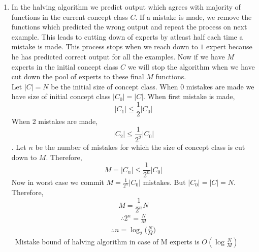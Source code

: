 \begin{enumerate}
    \item
		In the halving algorithm we predict output which agrees with majority of functions in the current concept class $C$. If a mistake is made, we remove the functions which predicted the wrong output and repeat the process on next example. This leads to cutting down of experts by atleast half      each time a mistake is made. This process stops when we reach down to $1$ expert because he has predicted correct output for all the examples. Now if we have $M$ experts in the initial concept class $C$ we will stop the algorithm when we have cut down the pool of experts  to these final $M$ functions.\\
		Let $|C| = N$ be the initial size of concept class. When $0$ mistakes are made we have size of initial concept class $|C_0| = |C|$. When first mistake is made, $$|C_1| \leq \frac{1}{2}|C_0|$$ When 2 mistakes are made, $$|C_2| \leq \frac{1}{2^2}|C_0|$$. Let $n$ be the number of mistakes for which the size of concept class is cut down to $M$. Therefore, $$M = |C_n| \leq \frac{1}{2^n}|C_0|$$
		Now in worst case we commit $M =  \frac{1}{2^n}|C_0|$ mistakes. But $|C_0| = |C| = N$. Therefore,
		$$M = \frac{1}{2^n}N$$
		\begin{align*}
			\therefore 2^n = \frac{N}{M}
		\end{align*}
		\begin{align*}
			\therefore n = \log_2 \bigg(\frac{N}{M}\bigg)    
		\end{align*}
		\therefore \ Mistake bound of halving algorithm in case of M experts is $O(\log \frac{N}{M})$
\end{enumerate}

